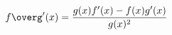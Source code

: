 \documentclass[preview]{standalone}
\begin{document}
\begin{align*}
f\overg'(x) = \frac{g(x) f'(x) - f(x) g'(x)} {g(x)^2}
\end{align*}
\end{document}
